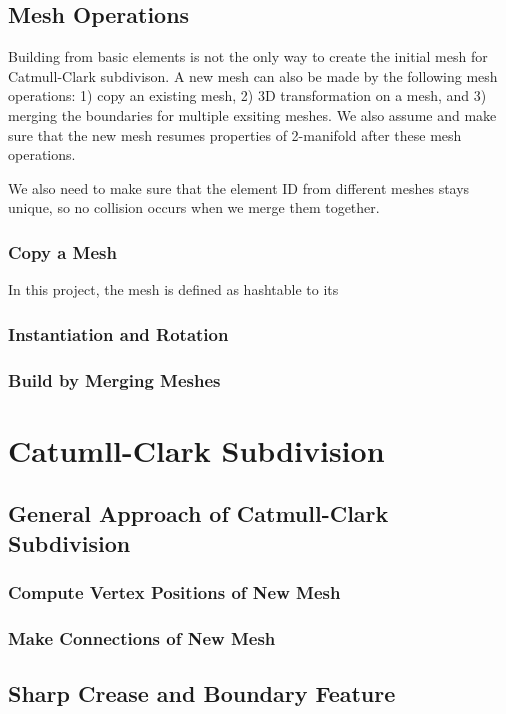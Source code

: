 \documentclass[12pt]{article}
\begin{document}
\subsection{Mesh Operations}
Building from basic elements is not the only way to create the initial mesh for Catmull-Clark subdivison. A new mesh can also be made by the following mesh operations: 1) copy an existing mesh, 2) 3D transformation on a mesh, and 3) merging the boundaries for multiple exsiting meshes. We also assume and make sure that the new mesh resumes properties of 2-manifold after these mesh operations.

We also need to make sure that the element ID from different meshes stays unique, so no collision occurs when we merge them together.


\subsubsection{Copy a Mesh}
In this project, the mesh is defined as hashtable to its 


\subsubsection{Instantiation and Rotation}
\subsubsection{Build by Merging Meshes}

\section{Catumll-Clark Subdivision} \label{sec:ccsd}

\subsection{General Approach of Catmull-Clark Subdivision}

\subsubsection{Compute Vertex Positions of New Mesh}

\subsubsection{Make Connections of New Mesh}

\subsection{Sharp Crease and Boundary Feature}
\end{document}
